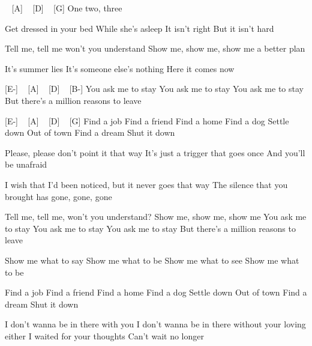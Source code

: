 
\begin{guitar}
[E-] ~ [A] ~ [D] ~ [G]
One two, three

Get dressed in your bed
While she's asleep
It isn't right
But it isn't hard

Tell me, tell me won't you understand
Show me, show me, show me a better plan

It's summer lies
It's someone else's nothing
Here it comes now

[E-] ~ [A] ~ [D] ~ [B-]
You ask me to stay
You ask me to stay
You ask me to stay
But there's a million reasons to leave

[E-] ~ [A] ~ [D] ~ [G]
Find a job
Find a friend
Find a home
Find a dog
Settle down
Out of town
Find a dream
Shut it down

Please, please don't point it that way
It's just a trigger that goes once
And you'll be unafraid

I wish that I'd been noticed, but it never goes that way
The silence that you brought has gone, gone, gone

Tell me, tell me, won't you understand?
Show me, show me, show me
You ask me to stay
You ask me to stay
You ask me to stay
But there's a million reasons to leave

Show me what to say
Show me what to be
Show me what to see
Show me what to be

Find a job
Find a friend
Find a home
Find a dog
Settle down
Out of town
Find a dream
Shut it down

I don't wanna be in there with you
I don't wanna be in there without your loving either
I waited for your thoughts
Can't wait no longer

\end{guitar}